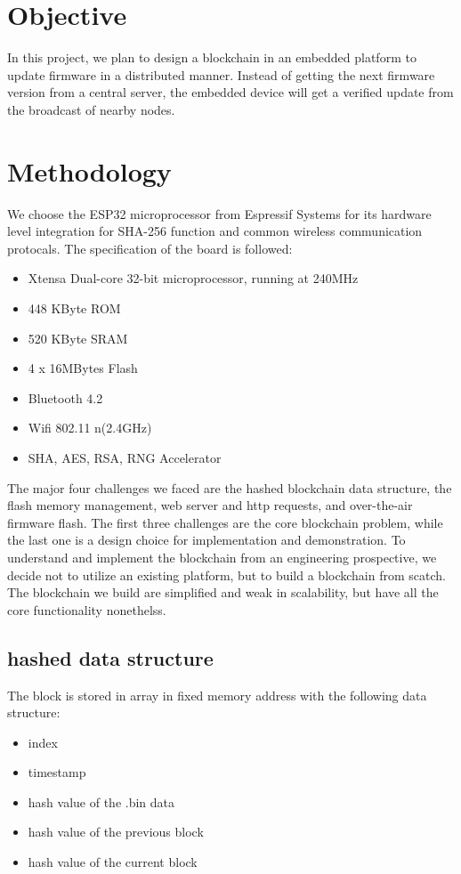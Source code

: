 \documentclass{article}
\begin{document}
\section{Objective}
    In this project, we plan to design a blockchain in an embedded platform to update firmware in a distributed manner. Instead of getting the next firmware version from a central server, the embedded device will get a verified update from the broadcast of nearby nodes.

\section{Methodology}
    We choose the ESP32 microprocessor from Espressif Systems for its hardware level integration for SHA-256 function and common wireless communication protocals. The specification of the board is followed:
    \begin{itemize}
      \item Xtensa Dual-core 32-bit microprocessor, running at 240MHz
      \item 448 KByte ROM
      \item 520 KByte SRAM
      \item 4 x 16MBytes Flash
      \item Bluetooth 4.2
      \item Wifi 802.11 n(2.4GHz)
      \item SHA, AES, RSA, RNG Accelerator
    \end{itemize}

    The major four challenges we faced are the hashed blockchain data structure, the flash memory management, web server and http requests, and over-the-air firmware flash. The first three challenges are the core blockchain problem, while the last one is a design choice for implementation and demonstration. To understand and implement the blockchain from an engineering prospective, we decide not to utilize an existing platform, but to build a blockchain from scatch. The blockchain we build are simplified and weak in scalability, but have all the core functionality nonethelss.

    \subsection{hashed data structure}
        The block is stored in array in fixed memory address with the following data structure:
        \begin{itemize}
          \item index
          \item timestamp
          \item hash value of the .bin data
          \item hash value of the previous block
          \item hash value of the current block
        \end{itemize}
\end{document}
